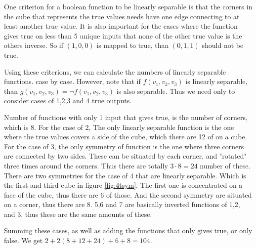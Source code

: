 One criterion for a boolean function to be linearly separable is that the corners in the cube that represents the true values needs have one edge connecting to at least another true value. It is also important for the cases where the function gives true on less than 5 unique inputs that none of the other true value is the others inverse. So if $(1,0,0)$ is mapped to true, than $(0,1,1)$ should not be true.

Using these criterions, we can calculate the numbers of linearly separable functions. case by case. However, note that if $f(v_1,v_2,v_3)$ is linearly separable, than $g(v_1,v_2,v_3) = \neg f(v_1,v_2,v_3)$ is also separable. Thus we need only to consider cases of 1,2,3 and 4 true outputs. 

Number of functions with only 1 input that gives true, is the number of corners, which is 8. For the case of 2, The only linearly separable function is the one where the true values covers a side of the cube, which there are 12 of on a cube. For the case of 3, the only symmetry of function is the one where three corners are connected by two sides. These can be situated by each corner, and "rotated" three times around the corners. Thus there are totally $3\cdot8 = 24$ number of these. There are two symmetries for the case of 4 that are linearly separable. Which is the first and third cube in figure \ref{fig:4tsym}. The first one is concentrated on a face of the cube, thus there are 6 of those. And the second symmetry are situated on a corner, thus there are 8. 5,6 and 7 are basically inverted functions of 1,2, and 3, thus these are the same amounts of these.

Summing these cases, as well as adding the functions that only gives true, or only false. We get $2 + 2(8 + 12 + 24) + 6 + 8 = 104$.